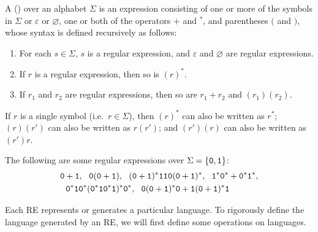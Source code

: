 A  () over an alphabet $\Sigma$ is an expression consisting of one or more of the symbols in $\Sigma$ or $\varepsilon$ or $\varnothing$, one or both of the operators $+$ and ${}^*$, and parentheses $($ and $)$, whose syntax is defined recursively as follows:
\begin{enumerate}
\item For each $s \in \Sigma$, $s$ is a regular expression, and $\varepsilon$ and $\varnothing$ are regular expressions.
\item If $r$ is a regular expression, then so is $(r)^*$.
\item If $r_1$ and $r_2$ are regular expressions, then so are $r_1 + r_2$ and $(r_1)(r_2)$.
\end{enumerate}

\begin{Note*}
If $r$ is a single symbol (i.e.\ $r \in \Sigma$), then $(r)^*$ can also be written as $r^*$; $(r)(r')$ can also be written as $r(r')$; and $(r')(r)$ can also be written as $(r')r$.
\end{Note*}

\begin{Example}
The following are some regular expressions over $\Sigma = \{\texttt 0, \texttt 1\}$:
\begin{align*}
& \texttt 0 + \texttt 1, ~~ \texttt 0(\texttt 0 + \texttt 1), ~~ (\texttt 0 + \texttt 1)^*\texttt 1\texttt 1\texttt 0(\texttt 0 + \texttt 1)^*, ~~ \texttt 1^* \texttt 0^* + \texttt 0^* \texttt 1^*, \\& ~~ \texttt 0^* \texttt 1 \texttt 0^*(\texttt 0^* \texttt 1 \texttt 0^* \texttt 1)^* \texttt 0^*, ~~ \texttt 0 (\texttt 0 + \texttt 1)^* \texttt 0 + \texttt 1 (\texttt 0 + \texttt 1)^* \texttt 1
\end{align*}
\end{Example}

Each RE represents or generates a particular language. To rigorously define the language generated by an RE, we will first define some operations on languages.

